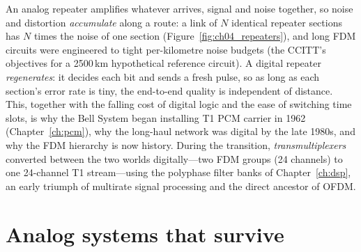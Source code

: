 \begin{keyidea}
An analog repeater amplifies whatever arrives, signal and noise together, so noise and distortion
\emph{accumulate} along a route: a link of $N$ identical repeater sections has $N$ times the noise of one
section (Figure~\ref{fig:ch04_repeaters}), and long FDM circuits were engineered to tight per-kilometre noise
budgets (the CCITT's objectives for a 2500\,km hypothetical reference circuit). A digital repeater
\emph{regenerates}: it decides each bit and sends a fresh pulse, so as long as each section's error rate is
tiny, the end-to-end quality is independent of distance. This, together with the falling cost of digital logic
and the ease of switching time slots, is why the Bell System began installing T1 PCM carrier in 1962
(Chapter~\ref{ch:pcm}), why the long-haul network was digital by the late 1980s, and why the FDM hierarchy is
now history. During the transition, \emph{transmultiplexers} converted between the two worlds digitally---two
FDM groups (24 channels) to one 24-channel T1 stream---using the polyphase filter banks of
Chapter~\ref{ch:dsp}, an early triumph of multirate signal processing and the direct ancestor of OFDM.
\end{keyidea}


\section{Analog systems that survive}
\label{sec:ch04:survive}

